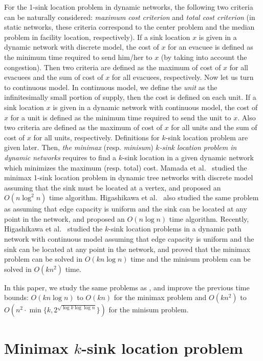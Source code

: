 \documentclass[a4paper]{llncs}
\begin{document}
For the 1-sink location problem in dynamic networks, the following two criteria can be naturally considered: {\it maximum cost criterion} and {\it total cost criterion}
(in static networks, these criteria correspond to the center problem and the median problem in facility location, respectively).
If a sink location $x$ is given in a dynamic network with discrete model, 
the cost of $x$ for an evacuee is defined as the minimum time required to send him/her to $x$
(by taking into account the congestion).
Then two criteria are defined as the maximum of cost of $x$ for all evacuees and the sum of cost of $x$ for all evacuees, respectively.
Now let us turn to continuous model. 
In continuous model, we define the {\it unit} as the infinitesimally small portion of supply,
then the cost is defined on each unit.
If a sink location $x$ is given in a dynamic network with continuous model, 
the cost of $x$ for a unit is defined as the minimum time required to send the unit to $x$.
Also two criteria are defined as the maximum of cost of $x$ for all units and the sum of cost of $x$ for all units, respectively.
Definitions for $k$-sink location problem are given later.
Then, {\it the minimax} (resp. {\it minisum}) {\it $k$-sink location problem in dynamic networks} requires to find a $k$-sink location in a given dynamic network which minimizes the maximum (resp. total) cost.
Mamada et al.~\cite{mumf06} studied the minimax 1-sink location problem in dynamic tree networks with discrete model assuming that the sink must be located at a vertex,
and proposed an $O(n \log^2 n)$ time algorithm. 
Higashikawa et al.~\cite{hgk14} also studied the same problem as \cite{mumf06} assuming that edge capacity is uniform and the sink can be located at any point in the network,
and proposed an $O(n \log n)$ time algorithm. 
Recently, Higashikawa et al.~\cite{hgk14_2} studied the $k$-sink location problems in a dynamic path network with continuous model assuming that edge capacity is uniform and the sink can be located at any point in the network, and proved that the minimax problem can be solved in $O(kn \log n)$ time and the minisum problem can be solved in $O(kn^2)$ time.

In this paper, we study the same problems as \cite{hgk14_2}, and improve the previous time bounds: 
$O(kn \log n)$ to $O(kn)$ for the minimax problem and $O(kn^2)$ to $O(n^2 \cdot \min \{ k, 2^{\sqrt{\log k \log \log n}}\})$ for the minisum problem.





\section{Minimax $k$-sink location problem}
\label{sec:minimax}
\end{document}
